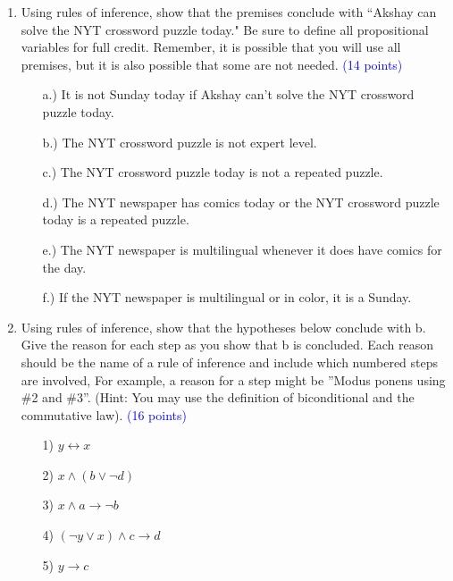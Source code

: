 \documentclass{article}
\newcommand{\pt}[1]{\textcolor{blue}{(#1 points)}}
\begin{document}
\begin{enumerate}
    \item Using rules of inference, show that the premises conclude with ``Akshay can solve the NYT crossword puzzle today." Be sure to define all propositional variables for full credit. Remember, it is possible that you will use all premises, but it is also possible that some are not needed. \pt{14}
    \begin{enumerate}
        \item[a.)] It is not Sunday today if Akshay can't solve the NYT crossword puzzle today.
        \item[b.)] The NYT crossword puzzle is not expert level.
        \item[c.)] The NYT crossword puzzle today is not a repeated puzzle.
        \item[d.)] The NYT newspaper has comics today or the NYT crossword puzzle today is a repeated puzzle.
        \item[e.)] The NYT newspaper is multilingual whenever it does have comics for the day.
        \item[f.)] If the NYT newspaper is multilingual or in color, it is a Sunday.
    \end{enumerate}
    \item{Using rules of inference, show that the hypotheses below conclude with b. Give the reason for each step as you show that b is concluded. Each reason should be the name of a rule of inference and include which numbered steps are involved, For example, a reason for a step might be ”Modus ponens using \#2 and \#3”. (Hint: You may use the definition of biconditional and the commutative law).} \pt{16}
    
    \begin{enumerate}
        \item[1)] $y \leftrightarrow x$
        \item[2)] $x \land (b \lor \lnot d)$
        \item[3)] $x \land a \rightarrow \lnot b$
        \item[4)] $(\lnot y \lor x) \land c \rightarrow d$
        \item[5)] $y \rightarrow c$
    \end{enumerate}
    

    \iffalse
    \item Given the following steps, state the errors with following uses of rules of inferences. If no errors are present, state that there is no error. For this question, $A$ represents an arbitrary propositional variable.
    \begin{enumerate}
        \item[1)] $F$ \hfill Given
        \item[2)] $F \lor A$  \hfill Addition on 1
        \item[3)] $F \lor A \lor \lnot A$ \hfill Addition on 2
        \item[4)] $F \lor T$ \hfill Negation Law on 3
        \item[5)] $T$ \hfill Domination Law on 4
    \end{enumerate}
    \fi
    

\end{enumerate}
\end{document}
